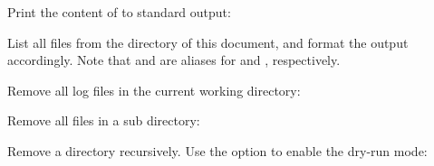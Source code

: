 \begin{flushleft}
\end{flushleft}

\begin{flushleft}
	Print the content of  to standard output:
\end{flushleft}

\begin{flushleft}
\end{flushleft}

\begin{flushleft}
	List all  files from the  directory of this document,
	and format the output accordingly. Note that  and  are
	aliases for  and , respectively.
\end{flushleft}

\begin{flushleft}
\end{flushleft}

\begin{flushleft}
	Remove all log files in the current working directory:
\end{flushleft}

\begin{flushleft}
\end{flushleft}

\begin{flushleft}
	Remove all  files in a sub directory:
\end{flushleft}

\begin{flushleft}
\end{flushleft}

\begin{flushleft}
	Remove a directory recursively. Use the  option to enable the
	dry-run	mode:
\end{flushleft}

\begin{flushleft}
\end{flushleft}
